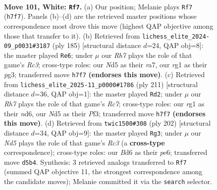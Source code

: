 \documentclass[11pt]{article}
\begin{document}
\clearpage

\begin{figure}[p]\centering
\begin{subfigure}{0.46\textwidth}\centering
\resizebox{\linewidth}{!}{%
\newchessgame
\chessboard[
  setfen={3k4/7R/PP1B4/3N4/4B1b1/1K5p/8/6r1 w - - 1 101},
  showmover=false,
  pgfstyle=straightmove, color=movearrow, markmove={h7-f7}
]}
\caption{}
\end{subfigure}\hfill
\begin{subfigure}{0.46\textwidth}\centering
\resizebox{\linewidth}{!}{%
\newchessgame
\chessboard[
  setfen={5k2/R7/2r5/2P4p/7B/3K1bP1/8/8 b - - 2 93},
  showmover=false,
  pgfstyle=straightmove, color=movearrow, markmove={c6-e6}
]}
\caption{}
\end{subfigure}
\\[4pt]
\begin{subfigure}{0.46\textwidth}\centering
\resizebox{\linewidth}{!}{%
\newchessgame
\chessboard[
  setfen={8/8/B2N2b1/8/5k1p/5p1P/2r5/5K2 b - - 5 106},
  showmover=false,
  pgfstyle=straightmove, color=movearrow, markmove={c2-d2}
]}
\caption{}
\end{subfigure}\hfill
\begin{subfigure}{0.46\textwidth}\centering
\resizebox{\linewidth}{!}{%
\newchessgame
\chessboard[
  setfen={8/8/1k1Bp1b1/4P3/4r1pK/2R5/8/8 w - - 74 102},
  showmover=false,
  pgfstyle=straightmove, color=movearrow, markmove={c3-g3}
]}
\caption{}
\end{subfigure}
\caption{\textbf{Move 101, White: \texttt{Rf7}.} (a) Our position; Melanie plays \texttt{Rf7} (\texttt{h7f7}). Panels (b)--(d) are the retrieved master positions whose correspondence most drove this move (highest QAP objective among those that transfer to it). (b) Retrieved from \texttt{lichess\_elite\_2024-09\_p0031\#3187} (ply 185) [structural distance $d$=24, QAP obj=8]: the master played \texttt{Re6}; under $\mu$ our \emph{Rh7} plays the role of that game's \emph{Rc3}; cross-type roles: our \emph{N}d5 as their \emph{r}a7, our \emph{r}g1 as their \emph{p}g3; transferred move \texttt{h7f7} \textbf{(endorses this move)}. (c) Retrieved from \texttt{lichess\_elite\_2025-11\_p0000\#1786} (ply 211) [structural distance $d$=36, QAP obj=1]: the master played \texttt{Rd2}; under $\mu$ our \emph{Rh7} plays the role of that game's \emph{Rc7}; cross-type roles: our \emph{r}g1 as their \emph{n}d6, our \emph{N}d5 as their \emph{P}f3; transferred move \texttt{h7f7} \textbf{(endorses this move)}. (d) Retrieved from \texttt{twic1500\#308} (ply 202) [structural distance $d$=34, QAP obj=9]: the master played \texttt{Rg3}; under $\mu$ our \emph{Nd5} plays the role of that game's \emph{Rc3} (a \textbf{cross-type} correspondence); cross-type roles: our \emph{B}d6 as their \emph{p}e6; transferred move \texttt{d5b4}. Synthesis: 3 retrieved analogs transferred to \texttt{Rf7} (summed QAP objective 11, the strongest correspondence among the candidate moves); Melanie committed it via the \texttt{search} selector.}
\label{fig:thought-m200}
\end{figure}
\end{document}
